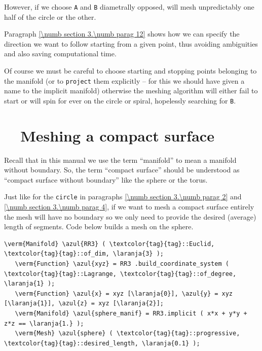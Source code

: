 However, if we choose {\small\tt A} and {\small\tt B} diametrally opposed, {\maniFEM} will
mesh unpredictably one half of the circle or the other.

Paragraph \ref{\numb section 3.\numb parag 12} shows how we can specify the direction we
want to follow starting from a given point, thus avoiding ambiguities and also saving
computational time.

Of course we must be careful to choose starting and stopping points belonging to the manifold
(or to {\small\tt project} them explicitly -- for this we should have given a name to the
implicit manifold) otherwise the meshing algorithm will either fail to start or will spin
for ever on the circle or spiral, hopelessly searching for {\small\tt B}.


\section{~~Meshing a compact surface}\label{\numb section 3.\numb parag 6}

Recall that in this manual we use the term ``manifold'' to mean a manifold without boundary.
So, the term ``compact surface'' should be understood as ``compact surface without boundary''
like the sphere or the torus.

Just like for the {\small\tt circle} in paragraphs \ref{\numb section 3.\numb parag 2} and
\ref{\numb section 3.\numb parag 4}, if we want to mesh a compact surface entirely
the mesh will have no boundary so we only need to provide the desired (average) length
of segments.
Code below builds a mesh on the sphere.

\begin{Verbatim}[commandchars=\\\{\},formatcom=\small\tt,frame=single,
   label=parag-\ref{\numb section 3.\numb parag 6}.cpp,rulecolor=\color{coment},
   baselinestretch=0.94,framesep=2mm                                            ]
   \verm{Manifold} \azul{RR3} ( \textcolor{tag}{tag}::Euclid, \textcolor{tag}{tag}::of_dim, \laranja{3} );
   \verm{Function} \azul{xyz} = RR3 .build_coordinate_system ( \textcolor{tag}{tag}::Lagrange, \textcolor{tag}{tag}::of_degree, \laranja{1} );
   \verm{Function} \azul{x} = xyz [\laranja{0}], \azul{y} = xyz [\laranja{1}], \azul{z} = xyz [\laranja{2}];
   \verm{Manifold} \azul{sphere_manif} = RR3.implicit ( x*x + y*y + z*z == \laranja{1.} );
   \verm{Mesh} \azul{sphere} ( \textcolor{tag}{tag}::progressive, \textcolor{tag}{tag}::desired_length, \laranja{0.1} );
\end{Verbatim}

